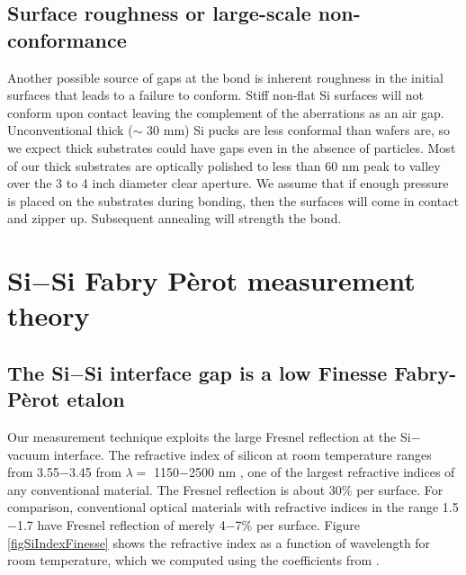 \documentclass[osajnl,preprint,showpacs,superscriptaddress,12pt]{revtex4-1} %
\begin{document}
\subsection{Surface roughness or large-scale non-conformance}
Another possible source of gaps at the bond is inherent roughness in the initial surfaces that leads to a failure to conform.  Stiff non-flat Si surfaces will not conform upon contact leaving the complement of the aberrations as an air gap. Unconventional thick ($\sim$ 30 mm) Si pucks are less conformal than wafers are, so we expect thick substrates could have gaps even in the absence of particles.  Most of our thick substrates are optically polished to less than 60 nm peak to valley over the 3 to 4 inch diameter clear aperture.  We assume that if enough pressure is placed on the substrates during bonding, then the surfaces will come in contact and zipper up.  Subsequent annealing will strength the bond.

\section{Si$-$Si Fabry P\`{e}rot measurement theory}
\label{secTheory}

\subsection{The Si$-$Si interface gap is a low Finesse Fabry-P\`{e}rot etalon}

Our measurement technique exploits the large Fresnel reflection \cite{2001opt4.book.....H} at the Si$-$vacuum interface.  The refractive index of silicon at room temperature ranges from 3.55$-$3.45 from $\lambda = $ 1150$-$2500 nm \cite{2006SPIE.6273E..77F}, one of the largest refractive indices of any conventional material.  The Fresnel reflection is about 30\% per surface.  For comparison, conventional optical materials with refractive indices in the range 1.5$-$1.7 have Fresnel reflection of merely 4$-$7\% per surface.  Figure \ref{figSiIndexFinesse} shows the refractive index as a function of wavelength for room temperature, which we computed using the coefficients from \cite{2006SPIE.6273E..77F}.
\end{document}
